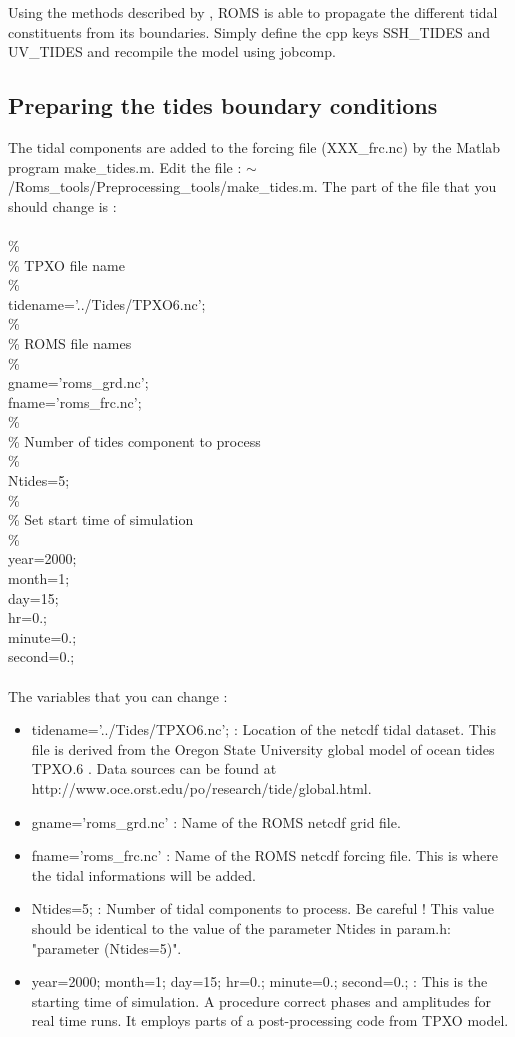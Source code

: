 Using the methods described by  \citet{Fla76}, ROMS is able to propagate the different 
tidal constituents from its boundaries. Simply  define  the cpp keys SSH\_TIDES
and UV\_TIDES and recompile the model using jobcomp.

\subsection{Preparing the tides boundary conditions}

The tidal components are added to the forcing file (XXX\_frc.nc)
by the Matlab program make\_tides.m.
Edit the file : $\sim$/Roms\_tools/Preprocessing\_tools/make\_tides.m.
The part of the file that you should change is :\\
\\
\%\\
\% TPXO file name\\
\%\\
tidename='../Tides/TPXO6.nc';\\
\%\\
\% ROMS file names\\
\%\\
gname='roms\_grd.nc';\\
fname='roms\_frc.nc';\\
\%\\
\% Number of tides component to process\\
\%\\
Ntides=5;\\
\%\\
\% Set start time of simulation\\
\%\\
year=2000;\\
month=1;\\
day=15;\\
hr=0.;\\
minute=0.;\\
second=0.;\\
\\
The variables that you can change :
\begin{itemize}
\item tidename='../Tides/TPXO6.nc'; : Location of the netcdf tidal dataset. 
This file is derived from 
the Oregon State University global model of ocean tides TPXO.6 \citep{Egb02}. 
Data sources can be found at 
http://www.oce.orst.edu/po/research/tide/global.html.
\item gname='roms\_grd.nc' : Name of the ROMS netcdf grid file.
\item fname='roms\_frc.nc' : Name of the ROMS netcdf forcing file. This is where 
the tidal informations will be added.
\item Ntides=5; : Number of tidal components to process. Be careful !
This value should be identical to the value of the parameter Ntides in param.h:
"parameter (Ntides=5)".
\item year=2000; month=1; day=15; hr=0.; minute=0.; second=0.; : This is the 
starting time of simulation. A procedure correct phases and amplitudes for real 
time runs. It employs parts of a post-processing code from \citet{Egb02} TPXO model.
\end{itemize}

